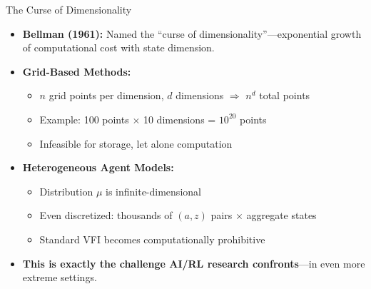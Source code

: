 \documentclass[10pt,english,aspectratio=169]{beamer}
\begin{document}
\begin{frame}{The Curse of Dimensionality}
\begin{itemize}
\item \textbf{Bellman (1961):} Named the ``curse of dimensionality''---exponential growth of computational cost with state dimension.

\medskip
\item \textbf{Grid-Based Methods:}
\begin{itemize}
    \item $n$ grid points per dimension, $d$ dimensions $\Rightarrow$ $n^d$ total points
    \item Example: 100 points $\times$ 10 dimensions = $10^{20}$ points
    \item Infeasible for storage, let alone computation
\end{itemize}

\medskip
\item \textbf{Heterogeneous Agent Models:}
\begin{itemize}
    \item Distribution $\mu$ is infinite-dimensional
    \item Even discretized: thousands of $(a, z)$ pairs $\times$ aggregate states
    \item Standard VFI becomes computationally prohibitive
\end{itemize}

\medskip
\item \textbf{This is exactly the challenge AI/RL research confronts}---in even more extreme settings.
\end{itemize}
\end{frame}

\end{document}
